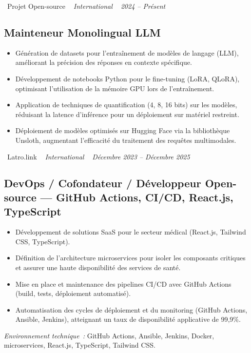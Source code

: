 \documentclass[10pt,a4paper]{article}
\begin{document}
\vspace{10pt}

\noindent\textcolor{primary}{ \faBuilding\ Projet Open-source} \quad
\textit{ \small \textcolor{darkgray}{ \faMapMarker\ } International } \hfill
\textit{ \small \textcolor{darkgray}{ \faCalendar\ } 2024 -- Présent }

\vspace{4pt}

\subsection*{Mainteneur Monolingual LLM}
\color{darkgray}
\begin{itemize}
  \item Génération de datasets pour l'entraînement de modèles de langage (LLM), améliorant la précision des réponses en contexte spécifique.
  \item Développement de notebooks Python pour le fine-tuning (LoRA, QLoRA), optimisant l'utilisation de la mémoire GPU lors de l'entraînement.
  \item Application de techniques de quantification (4, 8, 16 bits) sur les modèles, réduisant la latence d'inférence pour un déploiement sur matériel restreint.
  \item Déploiement de modèles optimisés sur Hugging Face via la bibliothèque Unsloth, augmentant l'efficacité du traitement des requêtes multimodales.
\end{itemize}

\vspace{10pt}

\noindent\textcolor{primary}{ \faBuilding\ Latro.link} \quad
\textit{ \small \textcolor{darkgray}{ \faMapMarker\ } International } \hfill
\textit{ \small \textcolor{darkgray}{ \faCalendar\ } Décembre 2023 -- Décembre 2025 }

\vspace{4pt}

\subsection*{DevOps / Cofondateur / Développeur Open-source --- GitHub Actions, CI/CD, React.js, TypeScript}
\color{darkgray}
\begin{itemize}
  \item Développement de solutions SaaS pour le secteur médical (React.js, Tailwind CSS, TypeScript).
  \item Définition de l'architecture microservices pour isoler les composants critiques et assurer une haute disponibilité des services de santé.
  \item Mise en place et maintenance des pipelines CI/CD avec GitHub Actions (build, tests, déploiement automatisé).
  \item Automatisation des cycles de déploiement et du monitoring (GitHub Actions, Ansible, Jenkins), atteignant un taux de disponibilité applicative de 99,9\%.
\end{itemize}
\textit{Environnement technique~:} GitHub Actions, Ansible, Jenkins, Docker, microservices, React.js, TypeScript, Tailwind CSS.
\end{document}
